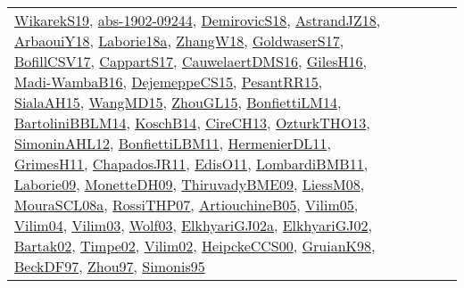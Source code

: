 {\begin{longtable}{lp{3cm}>{\raggedright}p{6cm}>{\raggedright}p{6cm}p{8cm}}
\href{articles/WikarekS19.pdf}{WikarekS19}\cite{WikarekS19}, \href{articles/abs-1902-09244.pdf}{abs-1902-09244}\cite{abs-1902-09244}, \href{papers/DemirovicS18.pdf}{DemirovicS18}\cite{DemirovicS18}, \href{papers/AstrandJZ18.pdf}{AstrandJZ18}\cite{AstrandJZ18}, \href{papers/ArbaouiY18.pdf}{ArbaouiY18}\cite{ArbaouiY18}, \href{papers/Laborie18a.pdf}{Laborie18a}\cite{Laborie18a}, \href{articles/ZhangW18.pdf}{ZhangW18}\cite{ZhangW18}, \href{papers/GoldwaserS17.pdf}{GoldwaserS17}\cite{GoldwaserS17}, \href{papers/BofillCSV17.pdf}{BofillCSV17}\cite{BofillCSV17}, \href{papers/CappartS17.pdf}{CappartS17}\cite{CappartS17}, \href{papers/CauwelaertDMS16.pdf}{CauwelaertDMS16}\cite{CauwelaertDMS16}, \href{papers/GilesH16.pdf}{GilesH16}\cite{GilesH16}, \href{papers/Madi-WambaB16.pdf}{Madi-WambaB16}\cite{Madi-WambaB16}, \href{papers/DejemeppeCS15.pdf}{DejemeppeCS15}\cite{DejemeppeCS15}, \href{papers/PesantRR15.pdf}{PesantRR15}\cite{PesantRR15}, \href{papers/SialaAH15.pdf}{SialaAH15}\cite{SialaAH15}, \href{articles/WangMD15.pdf}{WangMD15}\cite{WangMD15}, \href{papers/ZhouGL15.pdf}{ZhouGL15}\cite{ZhouGL15}, \href{papers/BonfiettiLM14.pdf}{BonfiettiLM14}\cite{BonfiettiLM14}, \href{papers/BartoliniBBLM14.pdf}{BartoliniBBLM14}\cite{BartoliniBBLM14}, \href{papers/KoschB14.pdf}{KoschB14}\cite{KoschB14}, \href{papers/CireCH13.pdf}{CireCH13}\cite{CireCH13}, \href{articles/OzturkTHO13.pdf}{OzturkTHO13}\cite{OzturkTHO13}, \href{papers/SimoninAHL12.pdf}{SimoninAHL12}\cite{SimoninAHL12}, \href{papers/BonfiettiLBM11.pdf}{BonfiettiLBM11}\cite{BonfiettiLBM11}, \href{papers/HermenierDL11.pdf}{HermenierDL11}\cite{HermenierDL11}, \href{papers/GrimesH11.pdf}{GrimesH11}\cite{GrimesH11}, \href{papers/ChapadosJR11.pdf}{ChapadosJR11}\cite{ChapadosJR11}, \href{papers/EdisO11.pdf}{EdisO11}\cite{EdisO11}, \href{papers/LombardiBMB11.pdf}{LombardiBMB11}\cite{LombardiBMB11}, \href{papers/Laborie09.pdf}{Laborie09}\cite{Laborie09}, \href{papers/MonetteDH09.pdf}{MonetteDH09}\cite{MonetteDH09}, \href{papers/ThiruvadyBME09.pdf}{ThiruvadyBME09}\cite{ThiruvadyBME09}, \href{articles/LiessM08.pdf}{LiessM08}\cite{LiessM08}, \href{papers/MouraSCL08a.pdf}{MouraSCL08a}\cite{MouraSCL08a}, \href{papers/RossiTHP07.pdf}{RossiTHP07}\cite{RossiTHP07}, \href{papers/ArtiouchineB05.pdf}{ArtiouchineB05}\cite{ArtiouchineB05}, \href{papers/Vilim05.pdf}{Vilim05}\cite{Vilim05}, \href{papers/Vilim04.pdf}{Vilim04}\cite{Vilim04}, \href{papers/Vilim03.pdf}{Vilim03}\cite{Vilim03}, \href{papers/Wolf03.pdf}{Wolf03}\cite{Wolf03}, \href{papers/ElkhyariGJ02a.pdf}{ElkhyariGJ02a}\cite{ElkhyariGJ02a}, \href{papers/ElkhyariGJ02.pdf}{ElkhyariGJ02}\cite{ElkhyariGJ02}, \href{papers/Bartak02.pdf}{Bartak02}\cite{Bartak02}, \href{articles/Timpe02.pdf}{Timpe02}\cite{Timpe02}, \href{papers/Vilim02.pdf}{Vilim02}\cite{Vilim02}, \href{articles/HeipckeCCS00.pdf}{HeipckeCCS00}\cite{HeipckeCCS00}, \href{papers/GruianK98.pdf}{GruianK98}\cite{GruianK98}, \href{papers/BeckDF97.pdf}{BeckDF97}\cite{BeckDF97}, \href{articles/Zhou97.pdf}{Zhou97}\cite{Zhou97}, \href{papers/Simonis95.pdf}{Simonis95}\cite{Simonis95}\\

\end{longtable}}

